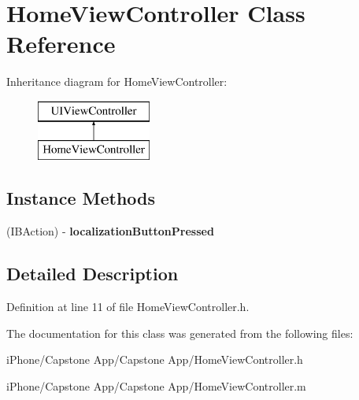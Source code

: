 \hypertarget{interface_home_view_controller}{\section{Home\-View\-Controller Class Reference}
\label{interface_home_view_controller}
}
Inheritance diagram for Home\-View\-Controller\-:\begin{figure}[H]
\begin{center}
\leavevmode
\includegraphics[height=2.000000cm]{interface_home_view_controller}
\end{center}
\end{figure}
\subsection*{Instance Methods}
\begin{DoxyCompactItemize}
\item 
\hypertarget{interface_home_view_controller_a6d4c00c84f905e2706316fee4741f836}{(I\-B\-Action) -\/ {\bfseries localization\-Button\-Pressed}}\label{interface_home_view_controller_a6d4c00c84f905e2706316fee4741f836}

\end{DoxyCompactItemize}


\subsection{Detailed Description}


Definition at line 11 of file Home\-View\-Controller.\-h.



The documentation for this class was generated from the following files\-:\begin{DoxyCompactItemize}
\item 
i\-Phone/\-Capstone App/\-Capstone App/Home\-View\-Controller.\-h\item 
i\-Phone/\-Capstone App/\-Capstone App/Home\-View\-Controller.\-m\end{DoxyCompactItemize}
